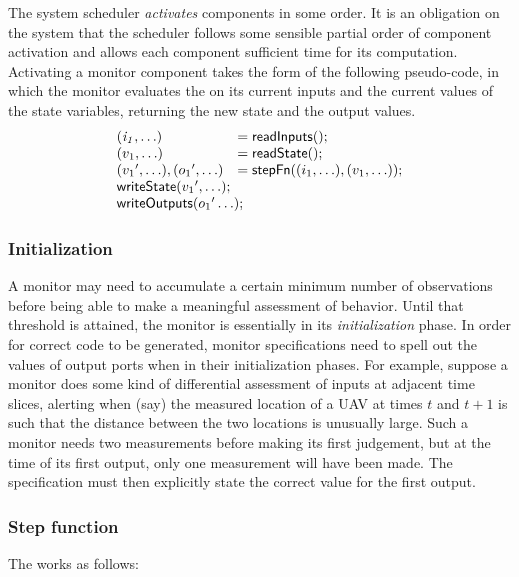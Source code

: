 The system scheduler \emph{activates} components in some order.
It is an obligation on the system that the scheduler follows some sensible partial order of component activation and allows each component sufficient time for its computation.
Activating a monitor component takes the form of the following pseudo-code, in which the monitor evaluates the  on its current inputs and the current values of the state variables, returning the new state and the output values.
\[
\begin{array}{ll}
 \mathit{(i_1,\ldots)} & = \konst{readInputs}(); \\
 (v_1,\ldots) & = \konst{readState}() ; \\
 ({v_1}',\ldots), ({o_1}',\ldots) & = \konst{stepFn} ((i_1,\ldots),(v_1,\ldots)) ; \\
 \multicolumn{2}{l}{\konst{writeState}({v_1}',\ldots);} \\
 \multicolumn{2}{l}{\konst{writeOutputs}({o_1}'\ldots);} \\
\end{array}
\]

\subsubsection{Initialization}

A monitor may need to accumulate a certain minimum number of observations before being able to make a meaningful assessment of behavior.
Until that threshold is attained, the monitor is essentially in its \emph{initialization} phase.
In order for correct code to be generated, monitor specifications need to spell out the values of output ports when in their initialization phases.
For example, suppose a monitor does some kind of differential assessment of inputs at adjacent time slices, alerting when (say) the measured location of a UAV at times $t$ and $t+1$ is such that the distance between the two locations is unusually large.
Such a monitor needs two measurements before making its first judgement, but at the time of its first output, only one measurement will have been made.
The specification must then explicitly state the correct value for the first output.

\subsubsection{Step function}

The  works as follows:

